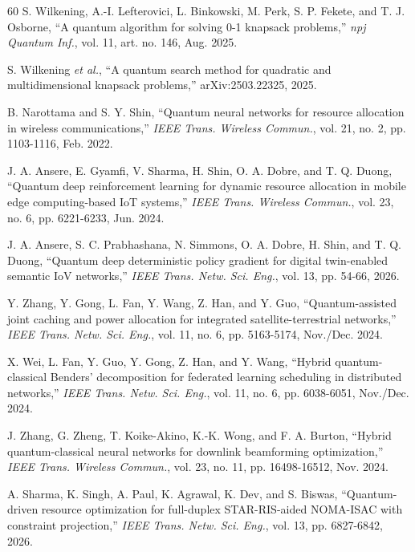 \documentclass[journal]{IEEEtran}
\begin{document}
\begin{thebibliography}{60}
S. Wilkening, A.-I. Lefterovici, L. Binkowski, M. Perk, S. P.
Fekete, and T. J. Osborne, ``A quantum algorithm for solving 0-1
knapsack problems,'' \emph{npj Quantum Inf.}, vol. 11, art. no.
146, Aug. 2025.

S. Wilkening \emph{et al.}, ``A quantum search method for quadratic
and multidimensional knapsack problems,'' arXiv:2503.22325, 2025.

B. Narottama and S. Y. Shin, ``Quantum neural networks for resource
allocation in wireless communications,'' \emph{IEEE Trans. Wireless
Commun.}, vol. 21, no. 2, pp. 1103-1116, Feb. 2022.

J. A. Ansere, E. Gyamfi, V. Sharma, H. Shin, O. A. Dobre, and
T. Q. Duong, ``Quantum deep reinforcement learning for dynamic
resource allocation in mobile edge computing-based IoT systems,''
\emph{IEEE Trans. Wireless Commun.}, vol. 23, no. 6,
pp. 6221-6233, Jun. 2024.

J. A. Ansere, S. C. Prabhashana, N. Simmons, O. A. Dobre, H. Shin,
and T. Q. Duong, ``Quantum deep deterministic policy gradient for
digital twin-enabled semantic IoV networks,'' \emph{IEEE Trans.
Netw. Sci. Eng.}, vol. 13, pp. 54-66, 2026.

Y. Zhang, Y. Gong, L. Fan, Y. Wang, Z. Han, and Y. Guo,
``Quantum-assisted joint caching and power allocation for
integrated satellite-terrestrial networks,'' \emph{IEEE Trans.
Netw. Sci. Eng.}, vol. 11, no. 6, pp. 5163-5174, Nov./Dec. 2024.

X. Wei, L. Fan, Y. Guo, Y. Gong, Z. Han, and Y. Wang, ``Hybrid
quantum-classical Benders' decomposition for federated learning
scheduling in distributed networks,'' \emph{IEEE Trans. Netw. Sci.
Eng.}, vol. 11, no. 6, pp. 6038-6051, Nov./Dec. 2024.

J. Zhang, G. Zheng, T. Koike-Akino, K.-K. Wong, and F. A. Burton,
``Hybrid quantum-classical neural networks for downlink
beamforming optimization,'' \emph{IEEE Trans. Wireless Commun.},
vol. 23, no. 11, pp. 16498-16512, Nov. 2024.

A. Sharma, K. Singh, A. Paul, K. Agrawal, K. Dev, and S. Biswas,
``Quantum-driven resource optimization for full-duplex
STAR-RIS-aided NOMA-ISAC with constraint projection,''
\emph{IEEE Trans. Netw. Sci. Eng.}, vol. 13, pp. 6827-6842, 2026.


\end{thebibliography}
\end{document}
